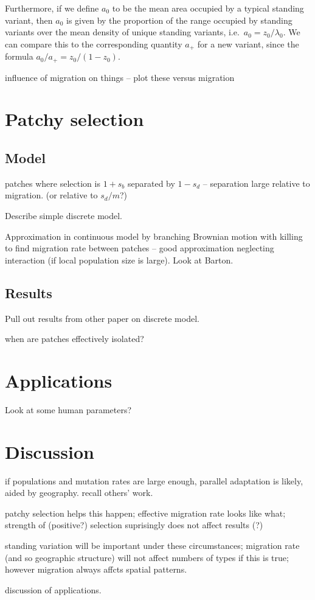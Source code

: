 \documentclass{article}
\begin{document}
Furthermore, if we define $a_0$ to be the mean area occupied by a typical standing variant, 
then $a_0$ is given by the proportion of the range occupied by standing variants over the mean density of unique standing variants,
i.e.\ $a_0 = z_0 / \lambda_0$.
We can compare this to the corresponding quantity $a_+$ for a new variant, since the formula
$a_0 / a_+ = z_0 / (1-z_0)$.


influence of migration on things -- plot these versus migration 


\section{Patchy selection} 

\subsection{Model} 

patches where selection is $1+s_b$ separated by $1-s_d$ -- separation large relative to migration.   
(or relative to $s_d/m$?) 

Describe simple discrete model. 

Approximation in continuous model by branching Brownian motion with killing to find migration rate between patches -- 
good approximation neglecting interaction (if local population size is large). 
Look at Barton. 

\subsection{Results} 

Pull out results from other paper on discrete model. 

when are patches effectively isolated? 

\section{Applications} 

Look at some human parameters? 

\section{Discussion} 

if populations and mutation rates are large enough, parallel adaptation is likely, aided by geography. 
recall others' work. 

patchy selection helps this happen; 
effective migration rate looks like what; 
strength of (positive?) selection suprisingly does not affect results (?) 

standing variation will be important under these circumstances; 
migration rate (and so geographic structure) will not affect numbers of types if this is true; 
however migration always affcts spatial patterns. 

discussion of applications. 
\end{document}

